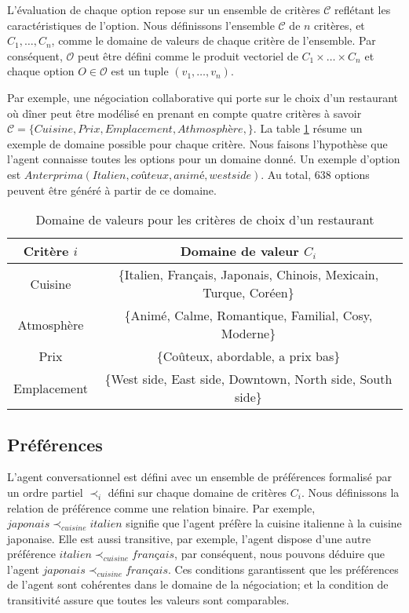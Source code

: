 	L'évaluation de chaque option repose sur un ensemble de critères $\mathcal{C}$ reflétant les caractéristiques de l'option. Nous définissons l'ensemble $\mathcal{C}$ de $n$ critères, et $C_1,\ldots,C_n$, comme le domaine de valeurs de chaque critère de l'ensemble. 
	Par conséquent, $\mathcal{O}$ peut être défini comme le produit vectoriel de  $C_1\times\ldots\times C_n$ et chaque option $O \in \mathcal{O}$ est un tuple $(v_1,\ldots,v_n)$. 
	
	Par exemple, une négociation collaborative qui porte sur le choix d'un restaurant où dîner peut être modélisé en prenant en compte quatre critères à savoir $\mathcal{C} = \{Cuisine, Prix, Emplacement, Athmosphère, \}$. La table \ref{tab:domain} résume un exemple de domaine possible pour chaque critère. Nous faisons l'hypothèse que l'agent connaisse toutes les options pour un domaine donné. Un exemple d'option est $ Anterprima(Italien, coûteux , animé, west side)$. Au total, $638$ options peuvent être généré à partir de ce domaine. 
	\begin{table}[h]
		\centering
		\begin{tabular}{|c|c|}
			\hline
			Critère $i $ & Domaine de valeur $C_i$ \\
			\hline
			Cuisine & \{Italien, Français, Japonais, Chinois, Mexicain, Turque, Coréen\} \\
			\hline
			Atmosphère & \{Animé, Calme, Romantique, Familial, Cosy, Moderne\} \\
			\hline
			Prix & \{Coûteux, abordable, a prix bas\} \\
			\hline
			Emplacement & \{West side, East side, Downtown, North side, South side\} \\
			\hline
			
		\end{tabular}
		\caption{Domaine de valeurs pour les critères de choix d'un restaurant} 
		\label{tab:domain}
	\end{table}
	
	\subsection{Préférences}
		L'agent conversationnel est défini avec un ensemble de préférences formalisé  par un ordre partiel $\prec_i$ défini sur chaque domaine de critères $C_i$. 
		Nous définissons la relation de préférence comme une relation binaire. Par exemple, $japonais \prec_{cuisine} italien$ signifie que l'agent préfère la cuisine italienne à la cuisine japonaise. Elle est aussi transitive, par exemple, l'agent dispose d'une autre préférence $italien \prec_{cuisine} français$, par conséquent, nous pouvons déduire que l'agent $japonais \prec_{cuisine} français$. Ces conditions garantissent que les préférences de l'agent sont cohérentes dans le domaine de la négociation; et la condition de transitivité assure que toutes les valeurs sont comparables.
		
